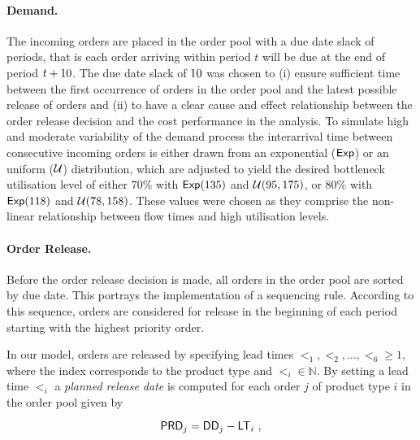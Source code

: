 \documentclass[envcountsame]{llncs}
\begin{document}
\paragraph{Demand.} The incoming orders are placed in the order pool with a due date slack of
\dds{} periods, that is each order arriving within period $t$ will be due at the end of period
$t+10{}$. The due date slack of \(10{}\) was chosen to (i) ensure sufficient time between the
first occurrence of orders in the order pool and the latest possible release of orders and (ii) to
have a clear cause and effect relationship between the order release decision and the cost
performance in the analysis.
%
To simulate high and moderate variability of the demand process the interarrival time between
consecutive incoming orders is either drawn from an exponential ($\mathsf{Exp}$) or an uniform ($\mathcal{U}$)
distribution, which are adjusted to yield the desired bottleneck utilisation level of either $70\%$
with $\mathsf{Exp}(135)$ and $\mathcal{U}(95,175)$, or $80\%$ with $\mathsf{Exp}(118)$ and $\mathcal{U}(78,158)$. These values
were chosen as they comprise the non-linear relationship between flow times and high utilisation
levels.

\paragraph{Order Release.}
%
Before the order release decision is made, all orders in the order pool are sorted by due date. This
portrays the implementation of a sequencing rule. According to this sequence, orders are considered
for release in the beginning of each period starting with the highest priority order.

In our model, orders are released by specifying lead times
$\lt_{1}, \lt_{2}, \ldots, \lt_{6} \geqslant 1$, where the index corresponds to the product type and
$\lt_{i} \in \mathbb{N}$.
%
%
By setting a lead time $\lt_{i}$ a \emph{planned release date} is computed for each
order $j$ of product type $i$ in the order pool given by
%
\begin{linenomath*}
  \begin{equation}
    \mathsf{PRD}{}_j= \mathsf{DD}{}_j - \mathsf{LT}_{i}\ ,
    \label{eq:Orel}
  \end{equation}
\end{linenomath*}
\end{document}
